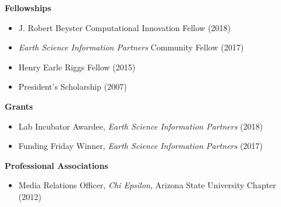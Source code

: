 

\textcolor{heading}{\textbf{Fellowships}}

\vspace{6pt}

\begin{itemize}
\item J. Robert Beyster Computational Innovation Fellow (2018)
\item \textit{Earth Science Information Partners} Community Fellow (2017)
\item Henry Earle Riggs Fellow (2015)
\item President's Scholarship (2007)
\end{itemize}

\vspace{6pt}

\textcolor{heading}{\textbf{Grants}}

\vspace{6pt}

\begin{itemize}
\item Lab Incubator Awardee, \textit{Earth Science Information Partners} (2018)
\item Funding Friday Winner, \textit{Earth Science Information Partners} (2017)
\end{itemize}

\vspace{6pt}

\textcolor{heading}{\textbf{Professional Associations}}

\vspace{6pt}

\begin{itemize}
\item Media Relations Officer, \textit{Chi Epsilon}, Arizona State
  University Chapter (2012)
\end{itemize}

\vspace{6pt}

